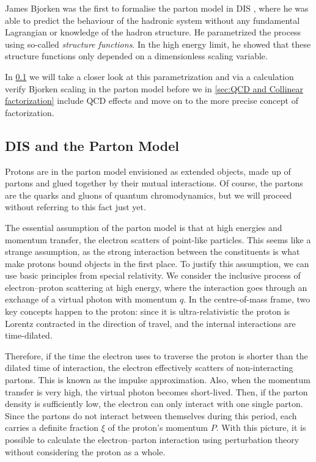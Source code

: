 James Bjorken was the first to formalise the parton model in DIS \cite{PhysRev.179.1547}, where he was able to predict the behaviour of the hadronic system without any fundamental Lagrangian or knowledge of the hadron structure. He parametrized the process using so-called \emph{structure functions}. In the high energy limit, he showed that these structure functions only depended on a dimensionless scaling variable. 

In \cref{sec:DIS and Parton model} we will take a closer look at this parametrization and via a calculation verify Bjorken scaling in the parton model before we in \cref{sec:QCD and Collinear factorization} include QCD effects and move on to the more precise concept of factorization. 

\subsection{DIS and the Parton Model}\label{sec:DIS and Parton model}
Protons are in the parton model envisioned as extended objects, made up of partons and glued together by their mutual interactions. Of course, the partons are the quarks and gluons of quantum chromodynamics, but we will proceed without referring to this fact just yet. 

The essential assumption of the parton model is that at high energies and momentum transfer, the electron scatters of  point-like particles. This seems like a strange assumption, as the strong interaction between the constituents is what make protons bound objects in the first place. To justify this assumption, we can use basic principles from special relativity. We consider the inclusive process of electron--proton scattering at high energy, where the interaction goes through an exchange of a virtual photon with momentum $q$. In the centre-of-mass frame, two key concepts happen to the proton: since it is ultra-relativistic the proton is Lorentz contracted in the direction of travel, and the internal interactions are time-dilated. 

Therefore, if the time the electron uses to traverse the proton is shorter than the dilated time of interaction, the electron effectively scatters of non-interacting partons. This is known as the impulse approximation. Also, when the momentum transfer is very high, the virtual photon becomes short-lived. Then, if the parton density is sufficiently low, the electron can only interact with one single parton. Since the partons do not interact between themselves during this period, each carries a definite fraction $\xi$ of the proton's momentum $P$. With this picture, it is possible to calculate the electron--parton interaction using perturbation theory without considering the proton as a whole.


